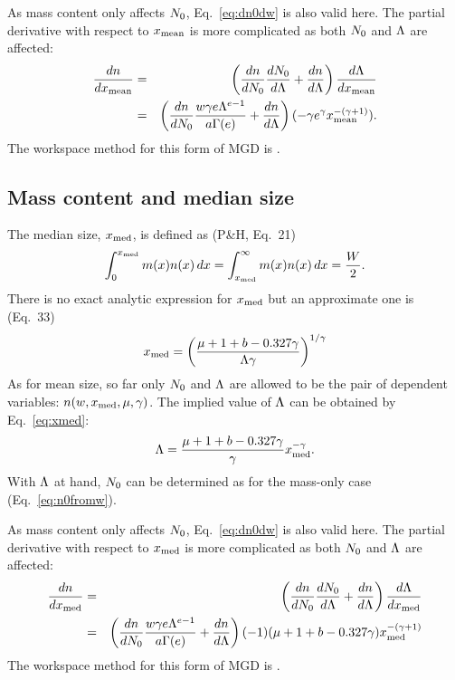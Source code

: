 As mass content only affects $N_0$, Eq.~\ref{eq:dn0dw} is also valid here. The
partial derivative with respect to $x_\mathrm{mean}$ is more complicated as both $N_0$
and $\Lambda$ are affected:
\begin{eqnarray}
  \frac{dn}{dx_\mathrm{mean}} &=& \left( \frac{dn}{dN_0}\frac{dN_0}{d\Lambda} + 
                        \frac{dn}{d\Lambda} \right) \frac{d\Lambda}{dx_\mathrm{mean}} \nonumber\\
 &=& \left( \frac{dn}{dN_0} \frac{w\gamma e\Lambda^{e-1}}{a\Gamma(e)} + 
                        \frac{dn}{d\Lambda} \right) (-\gamma e^\gamma x_\mathrm{mean}^{-(\gamma+1)}).
\end{eqnarray}
The workspace method for this form of MGD is .



\subsection{Mass content and median size}
%
The median size, $x_\mathrm{med}$, is defined as (P\&H, Eq.~21)
\begin{equation}
  \int_0^{x_\mathrm{med}} m(x) n(x)\, dx= \int_{x_\mathrm{med}}^\infty m(x) n(x)\, dx= \frac{W}{2}.
\end{equation}
There is no exact analytic expression for $x_\mathrm{med}$ but an approximate one is (Eq.~33)
\begin{equation}
  x_\mathrm{med} = \left( \frac{\mu+1+b-0.327\gamma}{\Lambda\gamma} \right)^{1/\gamma}
  \label{eq:xmed}
\end{equation}
As for mean size, so far only $N_0$ and $\Lambda$ are allowed to be the pair of
dependent variables: $n(w,x_\mathrm{med},\mu,\gamma)$. The implied value of $\Lambda$ can be
obtained by Eq.~\ref{eq:xmed}:
\begin{equation}
  \Lambda = \frac{\mu+1+b-0.327\gamma}{\gamma}x_\mathrm{med}^{-\gamma}. 
\end{equation}
With $\Lambda$ at hand, $N_0$ can be determined as for the mass-only case
(Eq.~\ref{eq:n0fromw}).

As mass content only affects $N_0$, Eq.~\ref{eq:dn0dw} is also valid here. The
partial derivative with respect to $x_\mathrm{med}$ is more complicated as both $N_0$
and $\Lambda$ are affected:
\begin{eqnarray}
  \frac{dn}{dx_\mathrm{med}} &=& \left( \frac{dn}{dN_0}\frac{dN_0}{d\Lambda} + 
                        \frac{dn}{d\Lambda} \right) \frac{d\Lambda}{dx_\mathrm{med}} \nonumber\\
 &=& \left( \frac{dn}{dN_0} \frac{w\gamma e\Lambda^{e-1}}{a\Gamma(e)} + 
                        \frac{dn}{d\Lambda} \right) (-1)(\mu+1+b-0.327\gamma)x_\mathrm{med}^{-(\gamma+1)} 
\end{eqnarray}
The workspace method for this form of MGD is .




